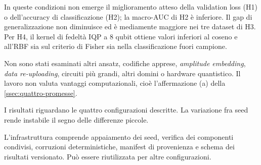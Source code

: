 In queste condizioni non emerge il miglioramento atteso della validation loss (H1) o
dell'accuracy di classificazione (H2); la macro-AUC di H2 è inferiore. Il gap di
generalizzazione non diminuisce ed è mediamente maggiore nei tre dataset di H3.
Per H4, il kernel di fedeltà IQP a 8 qubit ottiene valori inferiori al coseno e
all'RBF sia sul criterio di Fisher sia nella classificazione fuori campione.

Non sono stati esaminati altri ansatz, codifiche apprese, \emph{amplitude
embedding}, \emph{data re-uploading}, circuiti più grandi, altri domini o
hardware quantistico. Il lavoro non valuta vantaggi computazionali, cioè
l'affermazione (a) della \cref{ssec:quattro-promesse}.

I risultati riguardano le quattro configurazioni descritte. La variazione fra
seed rende instabile il segno delle differenze piccole.

L'infrastruttura comprende appaiamento dei seed, verifica dei componenti
condivisi, corruzioni deterministiche, manifest di provenienza e schema dei
risultati versionato. Può essere riutilizzata per altre configurazioni.
